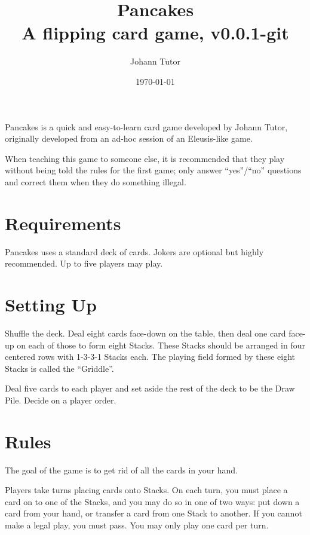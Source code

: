 \documentclass{article}
\newcommand\theversion{0.0.1-git}
\begin{document}
\title{Pancakes\\ \large A flipping card game, v\theversion}
\author{Johann Tutor}
\date{\today}
\maketitle

Pancakes is a quick and easy-to-learn card game developed by Johann Tutor, originally developed from an ad-hoc session of an Eleusis-like game.

When teaching this game to someone else, it is recommended that they play without being told the rules for the first game;
only answer ``yes''/``no'' questions and correct them when they do something illegal.

\tableofcontents

\newpage

\section{Requirements}

Pancakes uses a standard deck of cards. Jokers are optional but highly recommended.
Up to five players may play.

\section{Setting Up}
\label{sec:setup}

Shuffle the deck. Deal eight cards face-down on the table, then deal one card face-up on each of those to form eight Stacks.
These Stacks should be arranged in four centered rows with 1-3-3-1 Stacks each.
The playing field formed by these eight Stacks is called the ``Griddle''.

Deal five cards to each player and set aside the rest of the deck to be the Draw Pile. Decide on a player order.

\section{Rules}

The goal of the game is to get rid of all the cards in your hand.

Players take turns placing cards onto Stacks. On each turn, you must place a card on to one of the Stacks, and you may do so in one of two ways: put down a card from your hand, or transfer a card from one Stack to another. If you cannot make a legal play, you must pass. You may only play one card per turn.
\end{document}
